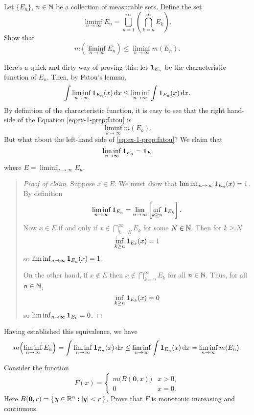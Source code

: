 \begin{problem}
  Let \(\{E_n\}\), \(n\in\mathbb{N}\) be a collection of measurable sets. Define
  the set
  \[
    \liminf_{n\to\infty} E_n
    =\bigcup_{n=1}^\infty\left(\bigcap_{k=n}^\infty E_k\right).
  \]
  Show that
  \[
    m\left(\liminf_{n\to\infty}
      E_n\right)\leq\liminf_{n\to\infty}m(E_n).
  \]
\end{problem}
\begin{solution}
  Here's a quick and dirty way of proving this: let \(\operatorname{\mathbf{1}}_{E_n}\) be the
  characteristic function of \(E_n\). Then, by Fatou's lemma,
  \begin{equation}
    \label{eq:ex-1-prep:fatou}
    \int\liminf_{n\to\infty}\operatorname{\mathbf{1}}_{E_n}(x)\mathop{}\!\mathrm{d} x
    \leq\liminf_{n\to\infty}\int\operatorname{\mathbf{1}}_{E_n}(x)\mathop{}\!\mathrm{d} x.
  \end{equation}
  By definition of the characteristic function, it is easy to see that the
  right hand-side of the Equation \eqref{eq:ex-1-prep:fatou} is
  \[
    \liminf_{k\to\infty}m(E_k).
  \]
  But what about the left-hand side of \eqref{eq:ex-1-prep:fatou}? We claim
  that
  \[
    \liminf_{n\to\infty}\operatorname{\mathbf{1}}_{E_n}=\operatorname{\mathbf{1}}_{E}
  \]
  where \(E=\liminf_{n\to\infty} E_n\).
  \begin{quote}
    \begin{proof}[Proof of claim]
      Suppose \(x\in E\). We must show that
      \(\liminf_{n\to\infty}\operatorname{\mathbf{1}}_{E_n}(x)=1\). By definition
      \[
        \liminf_{n\to\infty}\indicate_{E_n}=%
        \lim_{n\to\infty}\left[\inf_{k\geq n}\indicate_{E_k}\right].
      \]
      Now \(x\in E\) if and only if \(x\in \bigcap_{k=N}^\infty E_k\) for
      some \(N\in\mathbb{N}\). Then for \(k\geq N\)
      \[
        \inf_{k\geq n}\operatorname{\mathbf{1}}_{E_k}(x)=1
      \]
      so \(\liminf_{n\to\infty}\operatorname{\mathbf{1}}_{E_n}(x)=1\).

      On the other hand, if \(x\notin E\) then
      \(x\notin\bigcap_{k=n}^\infty E_k\) for all \(n\in\mathbb{N}\). Thus, for
      all \(n\in\mathbb{N}\),
      \[
        \inf_{k\geq n}\operatorname{\mathbf{1}}_{E_k}(x)=0
      \]
      so \(\liminf_{n\to\infty}\operatorname{\mathbf{1}}_{E_k}=0\).
    \end{proof}
  \end{quote}
  Having established this equivalence, we have
  \[
    m\Bigl(\liminf_{n\to\infty}E_n\Bigr)=%
    \int\liminf_{n\to\infty}\indicate_{E_n}(x)\diff x\leq%
    \liminf_{n\to\infty}\int\indicate_{E_n}(x)\diff x=%
    \liminf_{n\to\infty}m(E_n).
  \]
\end{solution}

\begin{problem}
  Consider the function
  \[
    F(x)=
    \begin{cases}
      m\bigl(B(\mathbf{0},x)\bigr)&x>0,\\
      0&x=0.
    \end{cases}
  \]
  Here \(B(\mathbf{0},r)=\left\{\, y \in\mathbb{R}^n:| y |<r\,\right\}\). Prove
  that \(F\) is monotonic increasing and continuous.
\end{problem}

